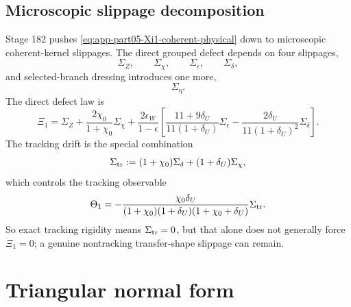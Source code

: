 \subsection{Microscopic slippage decomposition}
Stage 182 pushes \eqref{eq:app-part05-Xi1-coherent-physical} down to microscopic coherent-kernel slippages.  The direct grouped defect depends on four slippages,
\begin{equation}
\label{eq:app-part05-slippage-four}
\Sigma_Z,
\qquad
\Sigma_\chi,
\qquad
\Sigma_\epsilon,
\qquad
\Sigma_\delta,
\end{equation}
and selected-branch dressing introduces one more,
\begin{equation}
\label{eq:app-part05-slippage-eta}
\Sigma_\eta.
\end{equation}
The direct defect law is
\begin{equation}
\label{eq:app-part05-Xi1-slippage-law}
\Xi_1
=
\Sigma_Z
+
\frac{2\chi_0}{1+\chi_0}\Sigma_\chi
+
\frac{2\epsilon_W}{1-\epsilon}
\left[
\frac{11+9\delta_U}{11(1+\delta_U)}\Sigma_\epsilon
-
\frac{2\delta_U}{11(1+\delta_U)^2}\Sigma_\delta
\right].
\end{equation}
The tracking drift is the special combination
\begin{equation}
\label{eq:app-part05-Sigma-tr-def}
\Sigma_{\rm tr}:=(1+\chi_0)\Sigma_\delta+(1+\delta_U)\Sigma_\chi,
\end{equation}
which controls the tracking observable
\begin{equation}
\label{eq:app-part05-Theta-Sigma-tr}
\Theta_1
=
-
\frac{\chi_0\delta_U}{(1+\chi_0)(1+\delta_U)(1+\chi_0+\delta_U)}
\Sigma_{\rm tr}.
\end{equation}
So exact tracking rigidity means \(\Sigma_{\rm tr}=0\), but that alone does not generally force \(\Xi_1=0\); a genuine nontracking transfer-shape slippage can remain.


\section{Triangular normal form}
\label{sec:app-part05_weak_axisymmetric_orbit:triangular-normal-form}

